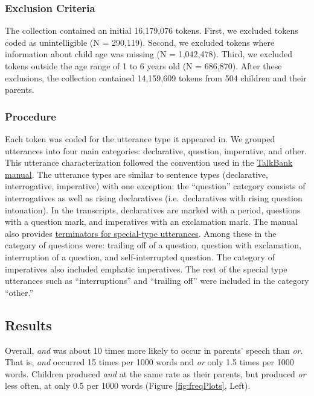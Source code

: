 \documentclass[
  english,
  ,man,floatsintext]{apa6}
\begin{document}
\hypertarget{exclusion-criteria}{%
\subsubsection{Exclusion Criteria}\label{exclusion-criteria}}

The collection contained an initial 16,179,076 tokens. First, we excluded tokens coded as unintelligible (N = 290,119). Second, we excluded tokens where information about child age was missing (N = 1,042,478). Third, we excluded tokens outside the age range of 1 to 6 years old (N = 686,870). After these exclusions, the collection contained 14,159,609 tokens from 504 children and their parents.

\hypertarget{procedure}{%
\subsubsection{Procedure}\label{procedure}}

Each token was coded for the utterance type it appeared in. We grouped utterances into four main categories: declarative, question, imperative, and other. This utterance characterization followed the convention used in the \href{https://talkbank.org/manuals/CHAT.html\#_Toc486414422}{TalkBank manual}. The utterance types are similar to sentence types (declarative, interrogative, imperative) with one exception: the ``question'' category consists of interrogatives as well as rising declaratives (i.e.~declaratives with rising question intonation). In the transcripts, declaratives are marked with a period, questions with a question mark, and imperatives with an exclamation mark. The manual also provides \href{https://talkbank.org/manuals/CHAT.html\#_Toc486414431}{terminators for special-type utterances}. Among these in the category of questions were: trailing off of a question, question with exclamation, interruption of a question, and self-interrupted question. The category of imperatives also included emphatic imperatives. The rest of the special type utterances such as ``interruptions'' and ``trailing off'' were included in the category ``other.''

\hypertarget{study1results}{%
\subsection{Results}\label{study1results}}

Overall, \emph{and} was about 10 times more likely to occur in parents' speech than \emph{or}. That is, \emph{and} occurred 15 times per 1000 words and \emph{or} only 1.5 times per 1000 words. Children produced \emph{and} at the same rate as their parents, but produced \emph{or} less often, at only 0.5 per 1000 words (Figure \ref{fig:freqPlots}, Left).
\end{document}
